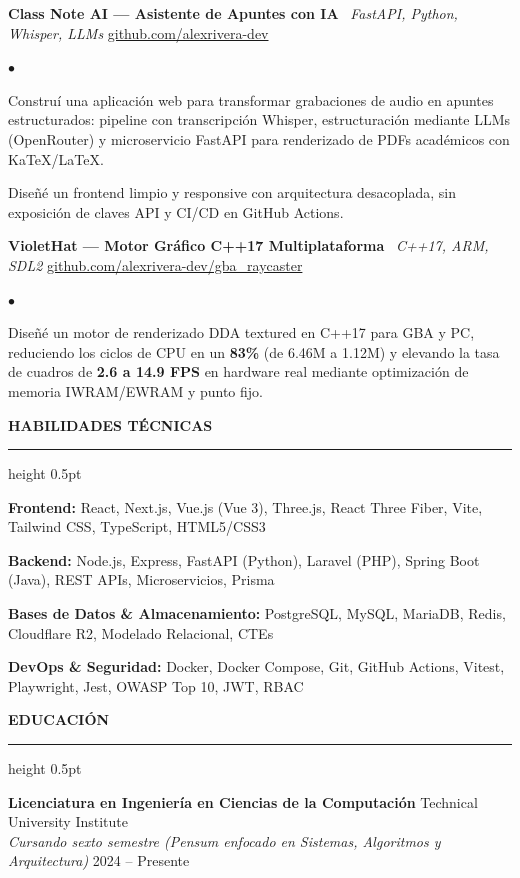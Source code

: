 \documentclass[10pt,letterpaper]{article}
\newcommand{\resumesection}[1]{%
  \vspace{2pt}%
  {\color{primary}\normalsize\bfseries\MakeUppercase{#1}}%
  \vspace{1pt}\hrule height 0.5pt\vspace{2pt}%
}
\renewenvironment{itemize}{%
  \begin{list}{\color{primary}$\bullet$}{%
    \setlength{\leftmargin}{1.1em}%
    \setlength{\itemsep}{0.5pt}%
    \setlength{\topsep}{1pt}%
    \setlength{\parsep}{0pt}%
    \setlength{\partopsep}{0pt}%
  }%
}{%
  \end{list}%
}
\newenvironment{skilllist}{%
  \begin{list}{}{%
    \setlength{\leftmargin}{0pt}%
    \setlength{\itemsep}{0.5pt}%
    \setlength{\topsep}{1pt}%
    \setlength{\parsep}{0pt}%
    \setlength{\partopsep}{0pt}%
  }%
}{%
  \end{list}%
}
\begin{document}
\vspace{1pt}

\textbf{Class Note AI — Asistente de Apuntes con IA} \textbar\ \textit{FastAPI, Python, Whisper, LLMs} \hfill \href{https://github.com/alexrivera-dev}{github.com/alexrivera-dev}
\begin{itemize}
    \item Construí una aplicación web para transformar grabaciones de audio en apuntes estructurados: pipeline con transcripción Whisper, estructuración mediante LLMs (OpenRouter) y microservicio FastAPI para renderizado de PDFs académicos con KaTeX/LaTeX.
    \item Diseñé un frontend limpio y responsive con arquitectura desacoplada, sin exposición de claves API y CI/CD en GitHub Actions.
\end{itemize}

\vspace{1pt}

\textbf{VioletHat — Motor Gráfico C++17 Multiplataforma} \textbar\ \textit{C++17, ARM, SDL2} \hfill \href{https://github.com/alexrivera-dev/gba_raycaster}{github.com/alexrivera-dev/gba\_raycaster}
\begin{itemize}
    \item Diseñé un motor de renderizado DDA textured en C++17 para GBA y PC, reduciendo los ciclos de CPU en un \textbf{83\%} (de 6.46M a 1.12M) y elevando la tasa de cuadros de \textbf{2.6 a 14.9 FPS} en hardware real mediante optimización de memoria IWRAM/EWRAM y punto fijo.
\end{itemize}

\resumesection{Habilidades Técnicas}
\begin{skilllist}
    \item \textbf{Frontend:} React, Next.js, Vue.js (Vue 3), Three.js, React Three Fiber, Vite, Tailwind CSS, TypeScript, HTML5/CSS3
    \item \textbf{Backend:} Node.js, Express, FastAPI (Python), Laravel (PHP), Spring Boot (Java), REST APIs, Microservicios, Prisma
    \item \textbf{Bases de Datos \& Almacenamiento:} PostgreSQL, MySQL, MariaDB, Redis, Cloudflare R2, Modelado Relacional, CTEs
    \item \textbf{DevOps \& Seguridad:} Docker, Docker Compose, Git, GitHub Actions, Vitest, Playwright, Jest, OWASP Top 10, JWT, RBAC
\end{skilllist}

\resumesection{Educación}
\textbf{Licenciatura en Ingeniería en Ciencias de la Computación} \hfill Technical University Institute \\
\textit{Cursando sexto semestre (Pensum enfocado en Sistemas, Algoritmos y Arquitectura)} \hfill 2024 -- Presente
\end{document}
